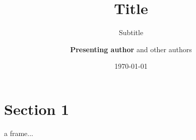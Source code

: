 \documentclass[english, aspectratio=169]{beamer}
\title{Title}
\subtitle{Subtitle}
\author[Name]{\textbf{Presenting author} and other authors}
\institute[uni]{Aarhus University}
\date{\today}
\begin{document}
\titleframe
\blankframe

\section{Section 1}
\begin{frame}
  a frame...
\end{frame}
\end{document}
